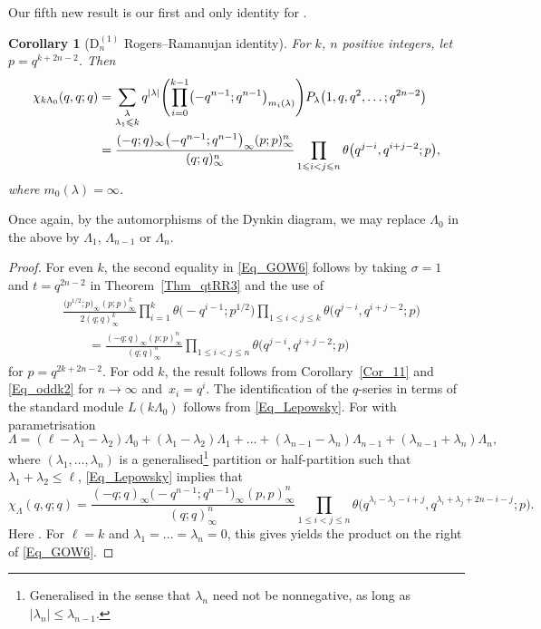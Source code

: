 \documentclass[pdftex]{sigma}
\numberwithin{equation}{section}
\newtheorem{Corollary}[Theorem]{Corollary}
\renewcommand{\leq}{\leqslant}
\newcommand{\abs}[1]{\vert#1\vert}
\newcommand{\la}{\lambda}
\newcommand{\La}{\Lambda}
\begin{document}
Our fifth new result is our first and only identity for .

\begin{Corollary}[$\textrm{D}_n^{(1)}$ Rogers--Ramanujan identity]
\label{Cor_14}
For $k$, $n$ positive integers, let $p=q^{k+2n-2}$.
Then
\begin{align}
\chi_{k\La_0}(q,q;q)&=\sum_{\substack{\la \\[1pt] \la_1\leq k}}
q^{\abs{\la}}
\Biggl(\prod_{i=0}^{k-1}\bigl({-}q^{n-1};q^{n-1}\bigr)_{m_i(\la)}\Biggr)
P_{\la}\bigl(1,q,q^2,\dots;q^{2n-2}\bigr) \notag \\
&=\frac{(-q;q)_{\infty}\bigl(-q^{n-1};q^{n-1}\bigr)_{\infty}
(p;p)_{\infty}^n}{(q;q)_{\infty}^n}
\prod_{1\leq i<j\leq n} \theta\bigl(q^{j-i},q^{i+j-2};p\bigr),
\label{Eq_GOW6}
\end{align}
where $m_0(\la)=\infty$.
\end{Corollary}

Once again, by the automorphisms of the  Dynkin diagram,
we may replace $\La_0$ in the above by $\La_1$, $\La_{n-1}$ or $\La_n$.

\begin{proof}
For even $k$, the second equality in \eqref{Eq_GOW6} follows by
taking $\sigma=1$ and $t=q^{2n-2}$ in Theorem~\ref{Thm_qtRR3}
and the use of
\begin{align*}
&\frac{\bigl(p^{1/2};p\bigr)_{\infty}
(p;p)_{\infty}^k}{2(q;q)_{\infty}^k}
\prod_{i=1}^k \theta\bigl({-}q^{i-1};p^{1/2}\bigr)
\prod_{1\leq i<j\leq k}\theta\bigl(q^{j-i},q^{i+j-2};p\bigr) \\
&\qquad=\frac{(-q;q)_{\infty}(p;p)_{\infty}^n}{(q;q)_{\infty}^n}
\prod_{1\leq i<j\leq n} \theta\bigl(q^{j-i},q^{i+j-2};p\bigr)
\end{align*}
for $p=q^{2k+2n-2}$.
For odd $k$, the result follows from Corollary~\ref{Cor_11} and
\eqref{Eq_oddk2} for $n\to\infty$ and~${x_i=q^i}$.
The identification of the $q$-series in terms of the 
standard module $L(k\La_0)$ follows from \eqref{Eq_Lepowsky}.
For  with parametrisation
\[
\La=(\ell-\la_1-\la_2)\La_0+(\la_1-\la_2)\La_1+\dots+
(\la_{n-1}-\la_n)\La_{n-1}+(\la_{n-1}+\la_n)\La_n,
\]
where $(\la_1,\dots,\la_n)$ is a generalised\footnote{Generalised in the
sense that $\la_n$ need not be nonnegative, as long as
$\abs{\la_n}\leq\la_{n-1}$.}
partition or half-partition such that $\la_1+\la_2\leq\ell$,
\eqref{Eq_Lepowsky} implies that
\[
\chi_{\La}(q,q;q)=
\frac{(-q;q)_{\infty}\bigl(-q^{n-1};q^{n-1}\bigr)_{\infty}(p,p)_{\infty}^n}
{(q;q)_{\infty}^n}
\prod_{1\leq i<j\leq n}
\theta\bigl(q^{\la_i-\la_j-i+j},q^{\la_i+\la_j+2n-i-j};p\bigr).
\]
Here .
For $\ell=k$ and $\la_1=\dots=\la_n=0$, this gives yields the
product on the right of \eqref{Eq_GOW6}.
\end{proof}
\end{document}
